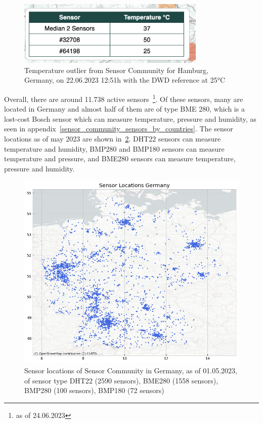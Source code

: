 \begin{figure}[ht]
    \centering
    \includegraphics[width=0.8\textwidth]{images/sensor_community_outliers.png}
    \caption{Temperature outlier from Sensor Community for Hamburg, Germany, on 22.06.2023 12:51h with the DWD reference at 25°C}
    \label{fig:temperature_sensor_community_outlier}
\end{figure}

Overall, there are around 11.738 active sensors~\footnote{as of 24.06.2023}. Of these sensors, many are located in Germany and almost half of them are of type BME 280, which is a lost-cost Bosch sensor which can measure temperature, pressure and humidity, as seen in appendix~\ref{sensor_community_sensors_by_countries}. The sensor locations as of may 2023 are shown in~\ref{fig:sensor community sensor locations germany}. DHT22 sensors can measure temperature and humidity, BMP280 and BMP180 sensors can measure temperature and pressure, and BME280 sensors can measure temperature, pressure and humidity.\\

\begin{figure}[ht]
    \centering
    \includegraphics[width=1\textwidth]{images/sc_sensor_locations_germany.png}
    \caption{Sensor locations of Sensor Community in Germany, as of 01.05.2023, of sensor type DHT22 (2590 sensors), BME280 (1558 sensors), BMP280 (100 sensors), BMP180 (72 sensors)}
    \label{fig:sensor community sensor locations germany}
\end{figure}

